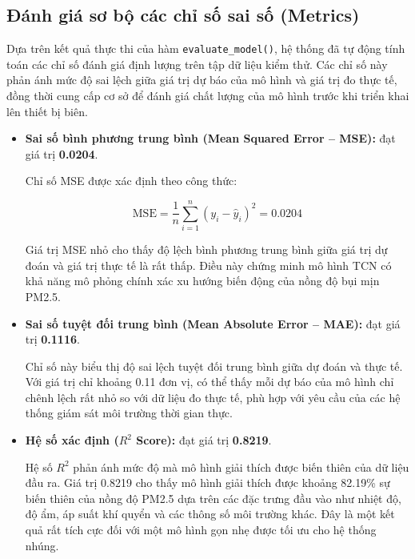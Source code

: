 \subsection{Đánh giá sơ bộ các chỉ số sai số (Metrics)}

Dựa trên kết quả thực thi của hàm \texttt{evaluate\_model()}, hệ thống đã tự động tính toán các chỉ số đánh giá định lượng trên tập dữ liệu kiểm thử. Các chỉ số này phản ánh mức độ sai lệch giữa giá trị dự báo của mô hình và giá trị đo thực tế, đồng thời cung cấp cơ sở để đánh giá chất lượng của mô hình trước khi triển khai lên thiết bị biên.

\begin{itemize}
    \item \textbf{Sai số bình phương trung bình (Mean Squared Error -- MSE):} đạt giá trị \textbf{0.0204}.

    Chỉ số MSE được xác định theo công thức:

    \begin{equation}
        \mathrm{MSE}
        =
        \frac{1}{n}
        \sum_{i=1}^{n}
        \left(y_i - \hat{y}_i\right)^2
        =
        0.0204
    \end{equation}

    Giá trị MSE nhỏ cho thấy độ lệch bình phương trung bình giữa giá trị dự đoán và giá trị thực tế là rất thấp. Điều này chứng minh mô hình TCN có khả năng mô phỏng chính xác xu hướng biến động của nồng độ bụi mịn PM2.5.

    \item \textbf{Sai số tuyệt đối trung bình (Mean Absolute Error -- MAE):} đạt giá trị \textbf{0.1116}.

    Chỉ số này biểu thị độ sai lệch tuyệt đối trung bình giữa dự đoán và thực tế. Với giá trị chỉ khoảng 0.11 đơn vị, có thể thấy mỗi dự báo của mô hình chỉ chênh lệch rất nhỏ so với dữ liệu đo thực tế, phù hợp với yêu cầu của các hệ thống giám sát môi trường thời gian thực.

    \item \textbf{Hệ số xác định (\(R^2\) Score):} đạt giá trị \textbf{0.8219}.

    Hệ số \(R^2\) phản ánh mức độ mà mô hình giải thích được biến thiên của dữ liệu đầu ra. Giá trị 0.8219 cho thấy mô hình giải thích được khoảng 82.19\% sự biến thiên của nồng độ PM2.5 dựa trên các đặc trưng đầu vào như nhiệt độ, độ ẩm, áp suất khí quyển và các thông số môi trường khác. Đây là một kết quả rất tích cực đối với một mô hình gọn nhẹ được tối ưu cho hệ thống nhúng.
\end{itemize}

